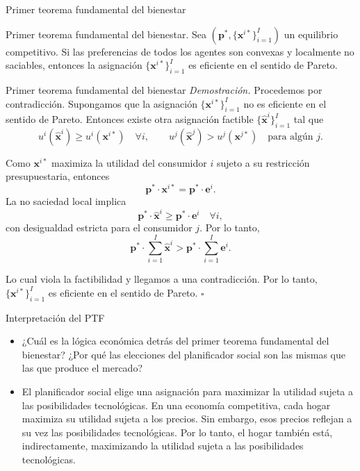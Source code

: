 \documentclass[aspectratio=169,11pt]{beamer}
\begin{document}
\begin{frame}{Primer teorema fundamental del bienestar}
\begin{theorem}{Primer teorema fundamental del bienestar.}
  Sea $\left(\mathbf{p}^*, \{\mathbf{x}^{i*}\}_{i=1}^I\right)$ un equilibrio competitivo. Si las preferencias de todos los agentes son convexas y localmente no saciables, entonces la asignación $\{\mathbf{x}^{i*}\}_{i=1}^I$ es eficiente en el sentido de Pareto.
\end{theorem}  
\end{frame}

\begin{frame}{Primer teorema fundamental del bienestar}
\small
\textit{Demostración.} Procedemos por contradicción. Supongamos que la asignación $\{\mathbf{x}^{i*}\}_{i=1}^I$ no es eficiente en el sentido de Pareto. Entonces existe otra asignación factible $\{\mathbf{\hat x}^i\}_{i=1}^I$ tal que
$$
  u^i(\hat{\mathbf{x}}^i)
  \geq
  u^i(\mathbf{x}^{i*})
  \quad\forall i,
  \qquad
  u^j(\hat{\mathbf{x}}^j)
  >
  u^j(\mathbf{x}^{j*})
  \quad\text{para algún }j.
$$

Como \(\mathbf{x}^{i*}\) maximiza la utilidad del consumidor \(i\)
sujeto a su restricción presupuestaria, entonces
\[
  \mathbf{p}^*\cdot\mathbf{x}^{i*}
  =
  \mathbf{p}^*\cdot\mathbf{e}^i.
\]
La no saciedad local implica
\[
  \mathbf{p}^*\cdot\hat{\mathbf{x}}^i
  \geq
  \mathbf{p}^*\cdot\mathbf{e}^i
  \quad\forall i,
\]
con desigualdad estricta para el consumidor \(j\). Por lo tanto,
\[
  \mathbf{p}^*\cdot\sum_{i=1}^{I}\hat{\mathbf{x}}^i
  >
  \mathbf{p}^*\cdot\sum_{i=1}^{I}\mathbf{e}^i.
\]

Lo cual viola la factibilidad y llegamos a una contradicción. Por lo tanto,
\(\{\mathbf{x}^{i*}\}_{i=1}^{I}\) es eficiente en el sentido de Pareto.
\hfill\(\square\)

\end{frame}


\begin{frame}{Interpretación del PTF}
  \begin{itemize}
    \item ¿Cuál es la lógica económica detrás del primer teorema fundamental del bienestar? ¿Por qué las elecciones del planificador social son las mismas que las que produce el mercado?
    \item El planificador social elige una asignación para maximizar la utilidad sujeta a las posibilidades tecnológicas. En una economía competitiva, cada hogar maximiza su utilidad sujeta a los precios. Sin embargo, esos precios reflejan a su vez las posibilidades tecnológicas. Por lo tanto, el hogar también está, indirectamente, maximizando la utilidad sujeta a las posibilidades tecnológicas.
  \end{itemize}
\end{frame}
\end{document}
